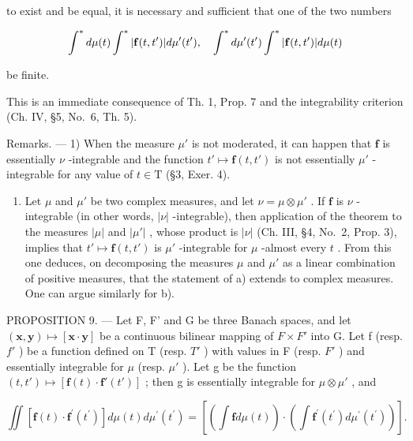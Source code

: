 to exist and be equal, it is necessary and sufficient that one of the two numbers

\[
\int^ {*} d \mu (t) \int^ {*} | {\bf f} (t, t ^ {\prime}) | d \mu^ {\prime} (t ^ {\prime}), \quad \int^ {*} d \mu^ {\prime} (t ^ {\prime}) \int^ {*} | {\bf f} (t, t ^ {\prime}) | d \mu (t)
\]

be finite.

This is an immediate consequence of Th. 1, Prop. 7 and the integrability criterion (Ch. IV, §5, No.~6, Th. 5).

Remarks. --- 1) When the measure \(\mu'\) is not moderated, it can happen that \(\mathbf{f}\) is essentially \(\nu\) -integrable and the function \(t' \mapsto \mathbf{f}(t, t')\) is not essentially \(\mu'\) -integrable for any value of \(t \in \mathrm{T}\) (§3, Exer. 4).

\begin{enumerate}
\def\labelenumi{\arabic{enumi})}
\setcounter{enumi}{1}
\tightlist
\item
  Let \(\mu\) and \(\mu'\) be two complex measures, and let \(\nu = \mu \otimes \mu'\) . If \(\mathbf{f}\) is \(\nu\) -integrable (in other words, \(|\nu|\) -integrable), then application of the theorem to the measures \(|\mu|\) and \(|\mu'|\) , whose product is \(|\nu|\) (Ch. III, §4, No.~2, Prop. 3), implies that \(t' \mapsto \mathbf{f}(t, t')\) is \(\mu'\) -integrable for \(\mu\) -almost every \(t\) . From this one deduces, on decomposing the measures \(\mu\) and \(\mu'\) as a linear combination of positive measures, that the statement of a) extends to complex measures. One can argue similarly for b).
\end{enumerate}

PROPOSITION 9. --- Let F, F' and G be three Banach spaces, and let \((\mathbf{x},\mathbf{y})\mapsto[\mathbf{x}\cdot\mathbf{y}]\) be a continuous bilinear mapping of \(F\times F'\) into G. Let f (resp. \(f'\) ) be a function defined on T (resp. \(T'\) ) with values in F (resp. \(F'\) ) and essentially integrable for \(\mu\) (resp. \(\mu'\) ). Let g be the function \((t,t')\mapsto[\mathbf{f}(t)\cdot\mathbf{f}'(t')]\) ; then g is essentially integrable for \(\mu\otimes\mu'\) , and

\[
\iint \left[ \mathbf {f} (t) \cdot \mathbf {f} ^ {\prime} \left(t ^ {\prime}\right) \right] d \mu (t) d \mu^ {\prime} \left(t ^ {\prime}\right) = \left[ \left(\int \mathbf {f} d \mu (t)\right) \cdot \left(\int \mathbf {f} ^ {\prime} \left(t ^ {\prime}\right) d \mu^ {\prime} \left(t ^ {\prime}\right)\right) \right].\tag{14}
\]

